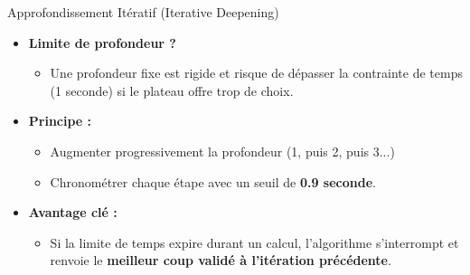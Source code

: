 \documentclass{beamer}
\begin{document}
\begin{frame}{Approfondissement Itératif (Iterative Deepening)}
    \begin{itemize}
        \item \textbf{Limite de profondeur ?}
        \begin{itemize}
            \item Une profondeur fixe est rigide et risque de dépasser la contrainte de temps (1 seconde) si le plateau offre trop de choix.
        \end{itemize}
        \vspace{0.2cm}
        \item \textbf{Principe :}
        \begin{itemize}
            \item Augmenter progressivement la profondeur (1, puis 2, puis 3...)
            \item Chronométrer chaque étape avec un seuil de \textbf{0.9 seconde}.
        \end{itemize}
        \vspace{0.2cm}
        \item \textbf{Avantage clé :} 
        \begin{itemize}
            \item Si la limite de temps expire durant un calcul, l'algorithme s'interrompt et renvoie le \textbf{meilleur coup validé à l'itération précédente}.
        \end{itemize}
    \end{itemize}
\end{frame}
\end{document}
